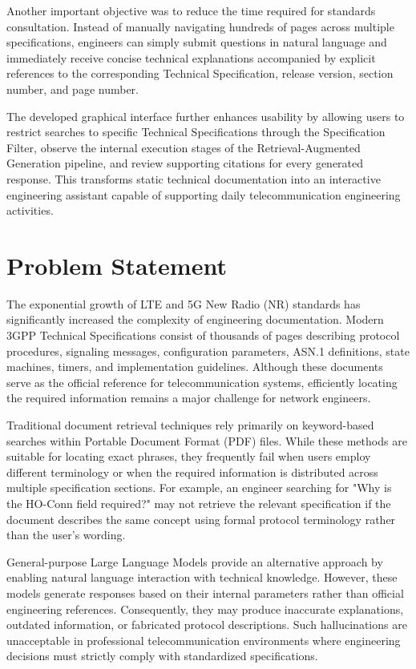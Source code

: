 Another important objective was to reduce the time required for standards consultation. Instead of manually navigating hundreds of pages across multiple specifications, engineers can simply submit questions in natural language and immediately receive concise technical explanations accompanied by explicit references to the corresponding Technical Specification, release version, section number, and page number.

The developed graphical interface further enhances usability by allowing users to restrict searches to specific Technical Specifications through the Specification Filter, observe the internal execution stages of the Retrieval-Augmented Generation pipeline, and review supporting citations for every generated response. This transforms static technical documentation into an interactive engineering assistant capable of supporting daily telecommunication engineering activities.
\section{Problem Statement}

The exponential growth of LTE and 5G New Radio (NR) standards has significantly increased the complexity of engineering documentation. Modern 3GPP Technical Specifications consist of thousands of pages describing protocol procedures, signaling messages, configuration parameters, ASN.1 definitions, state machines, timers, and implementation guidelines. Although these documents serve as the official reference for telecommunication systems, efficiently locating the required information remains a major challenge for network engineers.

Traditional document retrieval techniques rely primarily on keyword-based searches within Portable Document Format (PDF) files. While these methods are suitable for locating exact phrases, they frequently fail when users employ different terminology or when the required information is distributed across multiple specification sections. For example, an engineer searching for "Why is the HO-Conn field required?" may not retrieve the relevant specification if the document describes the same concept using formal protocol terminology rather than the user's wording.

General-purpose Large Language Models provide an alternative approach by enabling natural language interaction with technical knowledge. However, these models generate responses based on their internal parameters rather than official engineering references. Consequently, they may produce inaccurate explanations, outdated information, or fabricated protocol descriptions. Such hallucinations are unacceptable in professional telecommunication environments where engineering decisions must strictly comply with standardized specifications.

